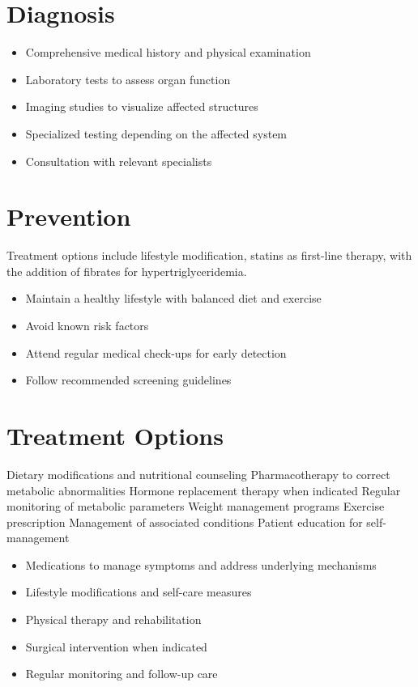 \section{Diagnosis}
\begin{itemize}[noitemsep]
  \item Comprehensive medical history and physical examination
  \item Laboratory tests to assess organ function
  \item Imaging studies to visualize affected structures
  \item Specialized testing depending on the affected system
  \item Consultation with relevant specialists
\end{itemize}
\section{Prevention}
Treatment options include lifestyle modification, statins as first-line therapy, with the addition of fibrates for hypertriglyceridemia.

\begin{itemize}[noitemsep]
  \item Maintain a healthy lifestyle with balanced diet and exercise
  \item Avoid known risk factors
  \item Attend regular medical check-ups for early detection
  \item Follow recommended screening guidelines
\end{itemize}
\section{Treatment Options}
Dietary modifications and nutritional counseling Pharmacotherapy to correct metabolic abnormalities Hormone replacement therapy when indicated Regular monitoring of metabolic parameters Weight management programs Exercise prescription Management of associated conditions Patient education for self-management

\begin{itemize}[noitemsep]
  \item Medications to manage symptoms and address underlying mechanisms
  \item Lifestyle modifications and self-care measures
  \item Physical therapy and rehabilitation
  \item Surgical intervention when indicated
  \item Regular monitoring and follow-up care
\end{itemize}
